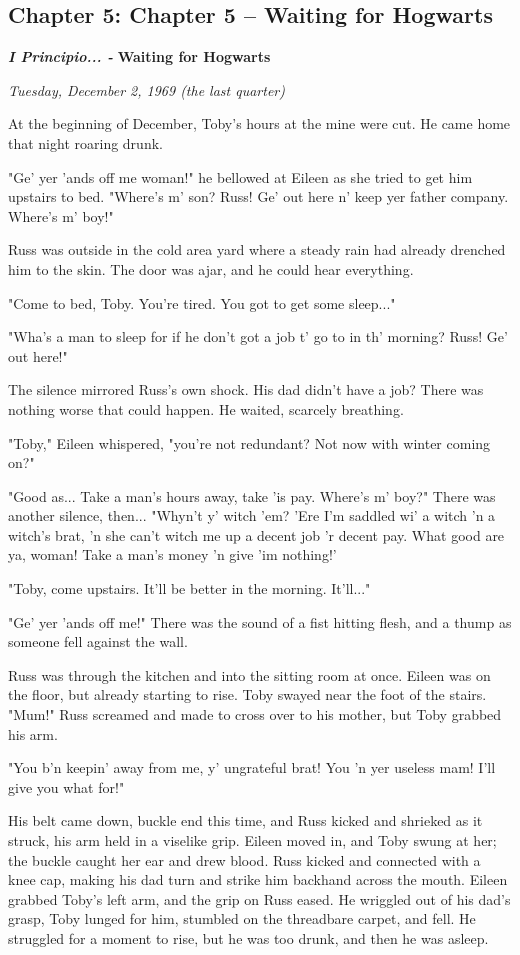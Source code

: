 \documentclass[a4paper,11pt]{article}
\begin{document}
\subsection{Chapter 5: Chapter 5 – Waiting for Hogwarts}

\emph{\textbf{I Principio... - }}\textbf{Waiting for Hogwarts}

\emph{Tuesday, December 2, 1969 (the last quarter)}

At the beginning of December, Toby's hours at the mine were cut. He came home that night roaring drunk.

"Ge' yer 'ands off me woman!" he bellowed at Eileen as she tried to get him upstairs to bed. "Where's m' son? Russ! Ge' out here n' keep yer father company. Where's m' boy!"

Russ was outside in the cold area yard where a steady rain had already drenched him to the skin. The door was ajar, and he could hear everything.

"Come to bed, Toby. You're tired. You got to get some sleep..."

"Wha's a man to sleep for if he don't got a job t' go to in th' morning? Russ! Ge' out here!"

The silence mirrored Russ's own shock. His dad didn't have a job? There was nothing worse that could happen. He waited, scarcely breathing.

"Toby," Eileen whispered, "you're not redundant? Not now with winter coming on?"

"Good as... Take a man's hours away, take 'is pay. Where's m' boy?" There was another silence, then... "Whyn't y' witch 'em? 'Ere I'm saddled wi' a witch 'n a witch's brat, 'n she can't witch me up a decent job 'r decent pay. What good are ya, woman! Take a man's money 'n give 'im nothing!'

"Toby, come upstairs. It'll be better in the morning. It'll..."

"Ge' yer 'ands off me!" There was the sound of a fist hitting flesh, and a thump as someone fell against the wall.

Russ was through the kitchen and into the sitting room at once. Eileen was on the floor, but already starting to rise. Toby swayed near the foot of the stairs. "Mum!" Russ screamed and made to cross over to his mother, but Toby grabbed his arm.

"You b'n keepin' away from me, y' ungrateful brat! You 'n yer useless mam! I'll give you what for!"

His belt came down, buckle end this time, and Russ kicked and shrieked as it struck, his arm held in a viselike grip. Eileen moved in, and Toby swung at her; the buckle caught her ear and drew blood. Russ kicked and connected with a knee cap, making his dad turn and strike him backhand across the mouth. Eileen grabbed Toby's left arm, and the grip on Russ eased. He wriggled out of his dad's grasp, Toby lunged for him, stumbled on the threadbare carpet, and fell. He struggled for a moment to rise, but he was too drunk, and then he was asleep.
\end{document}
